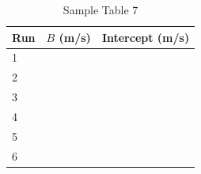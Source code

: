 %
\begin{table}[ht!]
    \begin{center}
        \begin{tabular}{l | l | l}
            \textbf{Run} & $B$ (m/s) & \textbf{Intercept} (m/s) \\
            \hline
            1 & & \\
            2 & & \\
            3 & & \\
            \hline
            4 & & \\
            5 & & \\
            6 & & \\
            \hline
        \end{tabular}
    \end{center}
    \caption{Sample Table 7}
\end{table}
%
\newpage
